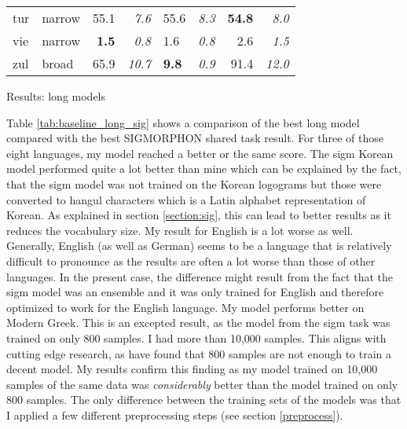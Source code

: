 {\begin{tabularx}{1.2\textwidth}{|l|X||r|r||X|X||r|r|}
tur       & narrow        & 55.1         & \textit{7.6}    & 55.6         & \textit{8.3}          & \textbf{54.8}   & \textit{8.0}    \\
vie       & narrow        & \textbf{1.5} & \textit{0.8}    & 1.6          & \textit{0.8}          & 2.6    & \textit{1.5}    \\
zul       & broad         & 65.9         & \textit{10.7}   & \textbf{9.8}          & \textit{0.9}          & 91.4   & \textit{12.0}   \\ \hline
\end{tabularx}
}{Results: long models}

Table \ref{tab:baseline_long_sig} shows a comparison of the best long model compared with the best SIGMORPHON shared task result. For three of those eight languages, my model reached a better or the same score. The \ac{sigm} Korean model performed quite a lot better than mine which can be explained by the fact, that the \ac{sigm} model was not trained on the Korean logograms but those were converted to hangul characters which is a Latin alphabet representation of Korean. As explained in section \ref{section:sig}, this can lead to better results as it reduces the vocabulary size. My result for English is a lot worse as well. Generally, English (as well as German) seems to be a language that is relatively difficult to pronounce as the results are often a lot worse than those of other languages. In the present case, the difference might result from the fact that the \ac{sigm} model was an ensemble and it was only trained for English and therefore optimized to work for the English language. My model performs better on Modern Greek. This is an excepted result, as the model from the \ac{sigm} task was trained on only 800 samples. I had more than 10,000 samples. This aligns with cutting edge research, as \citet{Ashby-Bartley.2021} have found that 800 samples are not enough to train a decent model. My results confirm this finding as my model trained on 10,000 samples of the same data was \textit{considerably} better than the model trained on only 800 samples. The only difference between the training sets of the models was that I applied a few different preprocessing steps (see section \ref{preprocess}). 

